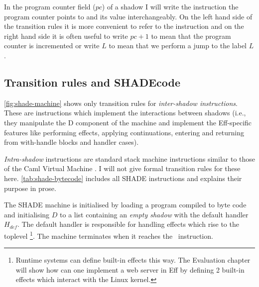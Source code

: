 \documentclass[class=article, crop=false]{standalone}
\begin{document}
In the program counter field ($pc$) of a shadow I will write the instruction
the program counter points to and its value interchangeably. On the left hand
side of the transition rules it is more convenient to refer to the instruction
and on the right hand side it is often useful to write $pc+1$ to mean that the
program counter is incremented or write $L$ to mean that we perform a jump to
the label $L$.

\subsection{Transition rules and SHADEcode}

\autoref{fig:shade-machine} shows only transition rules for \emph{inter-shadow
instructions}. These are instructions which implement the interactions between
shadows (i.e., they manipulate the D component of the machine and implement the
Eff-specific features like performing effects, applying continuations, entering
and returning from with-handle blocks and handler cases).

\emph{Intra-shadow} instructions are standard stack machine instructions similar
to those of the Caml Virtual Machine \cite{caml-vm}. I will not give formal
transition rules for these here. \autoref{tab:shade-bytecode} includes all
SHADE instructions and explains their purpose in prose.

The SHADE machine is initialised by loading a program compiled to byte code
and initialising $D$ to a list containing an \emph{empty shadow} with the
default handler $H_{def}$. The default handler is responsible for handling
effects which rise to the toplevel
\footnote{Runtime systems can define built-in effects this way. The Evaluation
chapter will show how can one implement a web server in Eff by defining 2
built-in effects which interact with the Linux kernel.}.
The machine terminates when it reaches the \vmHalt\ instruction.
\end{document}
